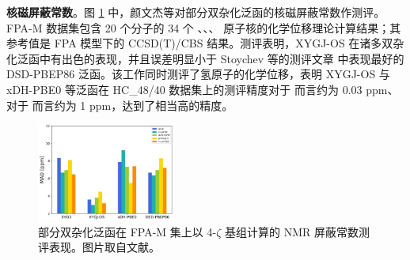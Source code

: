 \begin{table}[h]
\centering
\caption[泛函近似对分子谐振频率问题的测评]{部分泛函在 F38 测试集下谐振频率计算的测评表现。误差单位为波数 ($\text{cm}^{-1}$)。数据取自文献\cite{Gu-Xu.JCTC.2021}。}
\label{tab.1.xdh-freq-bench}
\end{table}

\textbf{核磁屏蔽常数}。图 \ref{fig.1.xdh-nmr} 中，颜文杰等对部分双杂化泛函的核磁屏蔽常数作测评\cite{Yan-Xu.JCTC.2022}。FPA-M 数据集包含 20 个分子的 34 个 、、、 原子核的化学位移理论计算结果；其参考值是 FPA 模型下的 CCSD(T)/CBS 结果。测评表明，XYGJ-OS 在诸多双杂化泛函中有出色的表现，并且误差明显小于 Stoychev 等的测评文章\cite{Stoychev-Neese.JCTC.2018} 中表现最好的 DSD-PBEP86 泛函。该工作同时测评了氢原子的化学位移，表明 XYGJ-OS 与 xDH-PBE0 等泛函在 HC\_48/40 数据集上的测评精度对于  而言约为 0.03 ppm、对于  而言约为 1 ppm，达到了相当高的精度。

\begin{figure}[h]
  \centering
  \includegraphics[width=0.4\textwidth]{assets/xdh-nmr.jpeg}
  \caption[泛函近似对 NMR 屏蔽常数问题的测评]{部分双杂化泛函在 FPA-M 集上以 4-$\zeta$ 基组计算的 NMR 屏蔽常数测评表现。图片取自文献\cite{Yan-Xu.JCTC.2022}。}
  \label{fig.1.xdh-nmr}
\end{figure}

